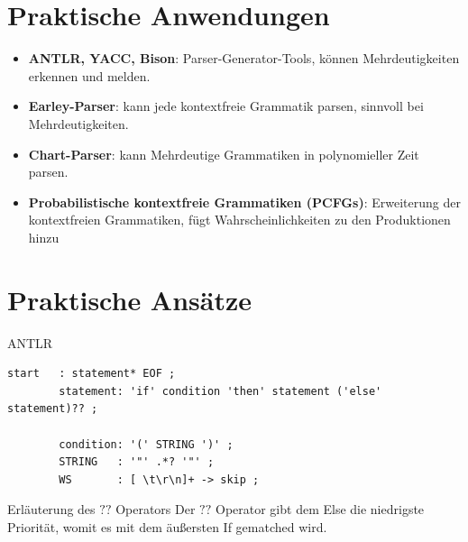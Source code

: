 \documentclass[t]{beamer}
\begin{document}
	\section{Praktische Anwendungen}\label{sec:praktische-ansatze1}
	\begin{frame}
	\begin{itemize}
		\item \textbf{ANTLR, YACC, Bison}: Parser-Generator-Tools, können Mehrdeutigkeiten erkennen und melden.
		\vspace{1em}
		\item \textbf{Earley-Parser}: kann jede kontextfreie Grammatik parsen, sinnvoll bei Mehrdeutigkeiten.\cite{qi2018generalized}
		\vspace{1em}
		\item \textbf{Chart-Parser}: kann Mehrdeutige Grammatiken in polynomieller Zeit parsen.
		\vspace{1em}
		\item \textbf{Probabilistische kontextfreie Grammatiken (PCFGs)}: Erweiterung der kontextfreien Grammatiken, fügt Wahrscheinlichkeiten zu den Produktionen hinzu
	\end{itemize}
	\end{frame}


	\section{Praktische Ansätze}\label{sec:praktische-ansatze2}
	\begin{frame}[fragile]
		\begin{block}{ANTLR}
			\hspace*{-3.5em}
			\begin{minipage}{\textwidth+3.5em}
				\begin{lstlisting}[style=antlr,label={lst:lstlisting3}]
        start   : statement* EOF ;
        statement: 'if' condition 'then' statement ('else' statement)?? ;

        condition: '(' STRING ')' ;
        STRING   : '"' .*? '"' ;
	    WS       : [ \t\r\n]+ -> skip ;
				\end{lstlisting}
			\end{minipage}
		\end{block}
		\vspace{1em}
		\begin{exampleblock}{Erläuterung des \(??\) Operators}
			Der \(??\) Operator gibt dem Else die niedrigste Priorität, womit es mit dem äußersten If gematched wird.
		\end{exampleblock}\cite{parr}
	\end{frame}
\end{document}
